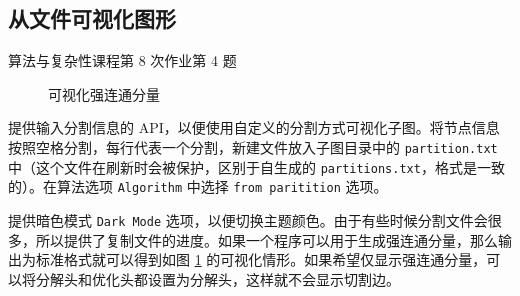 \documentclass[a4paper,12pt]{article}
\begin{document}
\begin{CJK}{UTF8}{song}
\subsection{从文件可视化图形}
\begin{CJK}{UTF8}{kai}
  算法与复杂性课程第 8 次作业第 4 题
\end{CJK}
\begin{figure}[h]
  \centering
  \caption{可视化强连通分量}
  \label{fig:scc}
\end{figure}

提供输入分割信息的 API，以便使用自定义的分割方式可视化子图。将节点信息按照空格分割，每行代表一个分割，新建文件放入子图目录中的 \verb"partition.txt" 中（这个文件在刷新时会被保护，区别于自生成的 \verb"partitions.txt"，格式是一致的）。在算法选项 \verb"Algorithm" 中选择 \verb"from paritition" 选项。

提供暗色模式 \verb"Dark Mode" 选项，以便切换主题颜色。由于有些时候分割文件会很多，所以提供了复制文件的进度。如果一个程序可以用于生成强连通分量，那么输出为标准格式就可以得到如图 \ref{fig:scc} 的可视化情形。如果希望仅显示强连通分量，可以将分解头和优化头都设置为分解头，这样就不会显示切割边。



\end{CJK}
\end{document}
